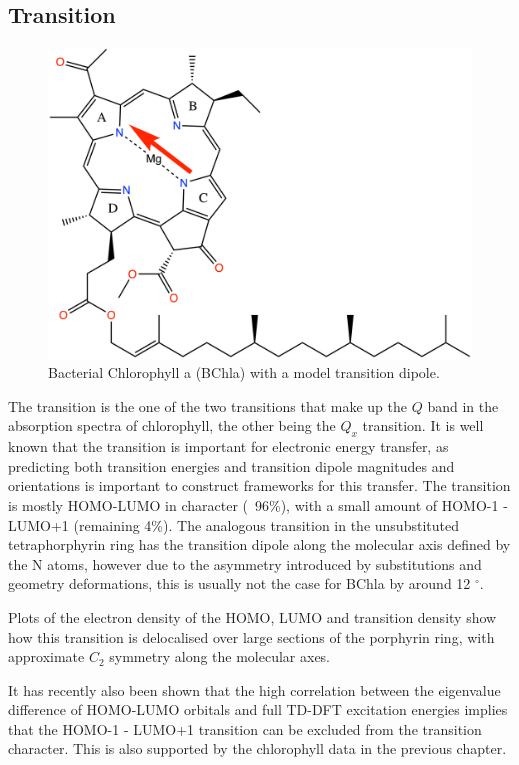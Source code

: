 \subsection{\Qy Transition}
\begin{figure}
    \centering
    \includegraphics{chapters/chapter03/chlorophyll_Qy.png}
    \caption{Bacterial Chlorophyll a (BChla) with a model \Qy transition dipole.}
    \label{fig:bchla_qy}
\end{figure}

The \Qy transition is the one of the two transitions that make up
the $Q$ band in the absorption spectra of chlorophyll, the other being the $Q_x$
transition. It is well known that the \Qy transition is important for electronic 
energy transfer, as predicting both transition energies and transition dipole 
magnitudes and orientations is important to construct frameworks for this transfer.
The \Qy transition is mostly HOMO-LUMO in character (~96\%), with a small amount of HOMO-1
- LUMO+1 (remaining 4\%). The analogous transition in the unsubstituted tetraphorphyrin
ring has the transition dipole along the molecular axis defined by the N atoms,
however due to the asymmetry introduced by substitutions and geometry deformations,
this is usually not the case for BChla by around 12 $^{\circ}$.

Plots of the electron density of the HOMO, LUMO and transition density show how
this transition is delocalised over large sections of the porphyrin ring, with 
approximate $C_2$ symmetry along the molecular axes.

It has recently also been shown that the high correlation between the eigenvalue
difference of HOMO-LUMO orbitals and full TD-DFT excitation energies implies that
the HOMO-1 - LUMO+1 transition can be excluded from the transition character. This
is also supported by the chlorophyll data in the previous chapter.

